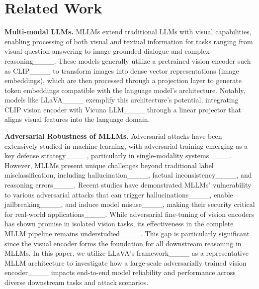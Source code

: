 \section{Related Work}
\textbf{Multi-modal LLMs.} MLLMs extend traditional LLMs with visual capabilities, enabling processing of both visual and textual information for tasks ranging from visual question-answering to image-grounded dialogue and complex reasoning____. These models generally utilize a pretrained vision encoder such as CLIP____ to transform images into dense vector representations (image embeddings), which are then processed through a projection layer to generate token embeddings compatible with the language model's architecture. Notably, models like LLaVA____ exemplify this architecture's potential, integrating CLIP vision encoder with Vicuna LLM____ through a linear projector that aligns visual features into the language domain.

\noindent \textbf{Adversarial Robustness of MLLMs.}
Adversarial attacks have been extensively studied in machine learning, with adversarial training emerging as a key defense strategy____, particularly in single-modality systems____. However, MLLMs present unique challenges beyond traditional label misclassification, including hallucination____, factual inconsistency____, and reasoning errors____.
Recent studies have demonstrated MLLMs' vulnerability to various adversarial attacks that can trigger hallucinations____, enable jailbreaking____, and induce model misuse____, making their security critical for real-world applications____. While adversarial fine-tuning of vision encoders has shown promise in isolated vision tasks, its effectiveness in the complete MLLM pipeline remains understudied____. This gap is particularly significant since the visual encoder forms the foundation for all downstream reasoning in MLLMs. In this paper, we utilize LLaVA's framework____ as a representative MLLM architecture to investigate how a large-scale adversarially trained vision encoder____ impacts end-to-end model reliability and performance across diverse downstream tasks and attack scenarios.




